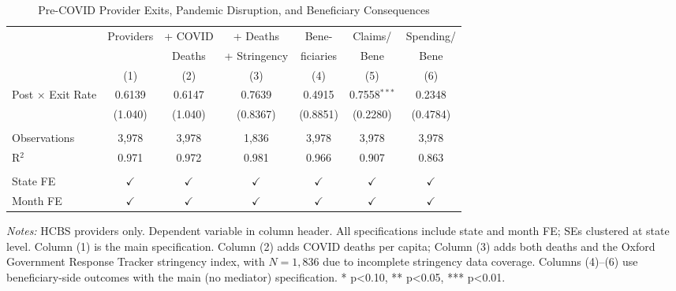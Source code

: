 
\begin{table}[htbp]
   \caption{\label{tab:main} Pre-COVID Provider Exits, Pandemic Disruption, and Beneficiary Consequences}
   \bigskip
   \centering
   \small
   \begin{tabular}{lcccccc}
      \toprule
                                           & Providers  & + COVID    & + Deaths   & Bene-       & Claims/   & Spending/ \\
                                           &            & Deaths     & + Stringency & ficiaries & Bene      & Bene      \\
                                           & (1)        & (2)        & (3)        & (4)         & (5)       & (6)\\
      \midrule
      Post $\times$ Exit Rate              & 0.6139     & 0.6147     & 0.7639     & 0.4915      & 0.7558$^{***}$ & 0.2348\\
                                           & (1.040)    & (1.040)    & (0.8367)   & (0.8851)    & (0.2280)  & (0.4784)\\
       \\
      Observations                         & 3,978      & 3,978      & 1,836      & 3,978       & 3,978     & 3,978\\
      R$^2$                                & 0.971      & 0.972      & 0.981      & 0.966       & 0.907     & 0.863\\
       \\
      State FE                             & $\checkmark$ & $\checkmark$ & $\checkmark$ & $\checkmark$ & $\checkmark$ & $\checkmark$\\
      Month FE                             & $\checkmark$ & $\checkmark$ & $\checkmark$ & $\checkmark$ & $\checkmark$ & $\checkmark$\\
      \bottomrule
   \end{tabular}

   \par \raggedright
   \textit{Notes:} HCBS providers only. Dependent variable in column header. All specifications include state and month FE; SEs clustered at state level. Column (1) is the main specification. Column (2) adds COVID deaths per capita; Column (3) adds both deaths and the Oxford Government Response Tracker stringency index, with $N = 1{,}836$ due to incomplete stringency data coverage. Columns (4)--(6) use beneficiary-side outcomes with the main (no mediator) specification. * p<0.10, ** p<0.05, *** p<0.01.
\end{table}

